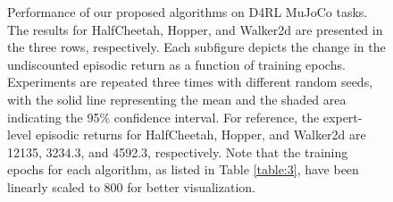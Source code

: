 \begin{figure}[t]
\caption{Performance of our proposed algorithms on D4RL MuJoCo tasks. The results for HalfCheetah, Hopper, and Walker2d are presented in the three rows, respectively. Each subfigure depicts the change in the undiscounted episodic return as a function of training epochs. Experiments are repeated three times with different random seeds, with the solid line representing the mean and the shaded area indicating the 95\% confidence interval. For reference, the expert-level episodic returns for HalfCheetah, Hopper, and Walker2d are 12135, 3234.3, and 4592.3, respectively. Note that the training epochs for each algorithm, as listed in Table \ref{table:3}, have been linearly scaled to 800 for better visualization.}
\label{fig:3} 
\end{figure}

